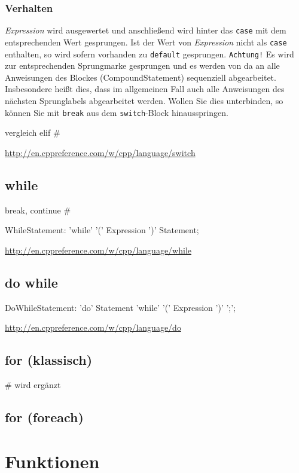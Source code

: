 \documentclass[a4paper]{report}
\begin{document}
\subsubsection{Verhalten}
\textit{Expression} wird ausgewertet und anschließend wird hinter das \texttt{case} mit dem entsprechenden Wert gesprungen. Ist der Wert von \textit{Expression} nicht als \texttt{case} enthalten, so wird sofern vorhanden zu \texttt{default} gesprungen. \texttt{Achtung!} Es wird zur entsprechenden Sprungmarke gesprungen und es werden von da an alle Anweisungen des Blockes (CompoundStatement) sequenziell abgearbeitet. Insbesondere heißt dies, dass im allgemeinen Fall auch alle Anweisungen des nächsten Sprunglabels abgearbeitet werden. Wollen Sie dies unterbinden, so können Sie mit \texttt{break} aus dem \texttt{switch}-Block hinausspringen.

vergleich elif \#%

\url{http://en.cppreference.com/w/cpp/language/switch}

\subsection{while}
break, continue \# %
\begin{rail}
	WhileStatement: 'while' '(' Expression ')' Statement;
\end{rail}

\url{http://en.cppreference.com/w/cpp/language/while}
\subsection{do while}

\begin{rail}
	DoWhileStatement: 'do' Statement 'while' '(' Expression ')' ';';
\end{rail}
\url{http://en.cppreference.com/w/cpp/language/do}

\subsection{for (klassisch)}
\# wird ergänzt

\subsection{for (foreach)}


\section{Funktionen}
\end{document}

